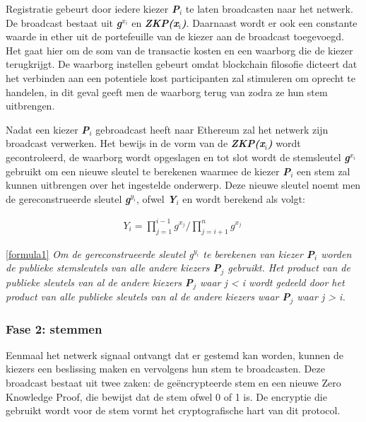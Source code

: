 			Registratie gebeurt door iedere kiezer \textbf{\textit{P$_{i}$}} te laten broadcasten naar het netwerk. De broadcast bestaat uit \textbf{\textit{g$^{x_{i}}$}}  en \textbf{\textit{ZKP(x$_{i}$)}}. Daarnaast wordt er ook een constante waarde in ether uit de portefeuille van de kiezer aan de broadcast toegevoegd. Het gaat hier om de som van de transactie kosten en een waarborg die de kiezer terugkrijgt. De waarborg instellen gebeurt omdat blockchain filosofie dicteert dat het verbinden aan een potentiele kost participanten zal stimuleren om oprecht te handelen, in dit geval geeft men de waarborg terug van zodra ze hun stem uitbrengen. 
			
			Nadat een kiezer \textbf{\textit{P$_{i}$}}  gebroadcast heeft naar Ethereum zal het netwerk zijn broadcast verwerken. Het bewijs in de vorm van de \textbf{\textit{ZKP(x$_{i}$)}} wordt gecontroleerd, de waarborg wordt opgeslagen en tot slot wordt de  stemsleutel \textbf{\textit{g$^{x_{i}}$}} gebruikt om een nieuwe sleutel te berekenen waarmee de kiezer \textbf{\textit{P$_{i}$}} een stem zal kunnen uitbrengen over het ingestelde onderwerp. Deze nieuwe sleutel noemt men de gereconstrueerde sleutel \textbf{\textit{g$^{y_{i}}$}}, ofwel \textbf{\textit{Y$_{i}$}} en wordt berekend als volgt: 
			\begin{ceqn}
				\begin{align}
					Y_{i} = \prod_{j=1}^{i-1}g^{x_{j}}  / \prod_{j=i+1}^{n}g^{x_{j}} \label{formula1}\
				\end{align}
			\end{ceqn}
			
			\eqref{formula1} \textit{Om de gereconstrueerde sleutel g$^{y_{i}}$ te berekenen van kiezer \textbf{P$_{i}$} worden de publieke stemsleutels van alle andere kiezers \textbf{P$_{j}$} gebruikt. Het product van de publieke sleutels van al de andere kiezers \textbf{P$_{j}$} waar j < i wordt gedeeld door het product van alle publieke sleutels van al de andere kiezers waar \textbf{P$_{j}$} waar  j > i.}
			
		\subsubsection*{Fase 2: stemmen}
			Eenmaal het netwerk signaal ontvangt dat er gestemd kan worden, kunnen de kiezers een beslissing maken en vervolgens hun stem te broadcasten. Deze broadcast bestaat uit twee zaken: de geëncrypteerde stem en een nieuwe Zero Knowledge Proof, die bewijst dat de stem ofwel 0 of 1 is. De encryptie die gebruikt wordt voor de stem vormt het cryptografische hart van dit protocol. 
			
